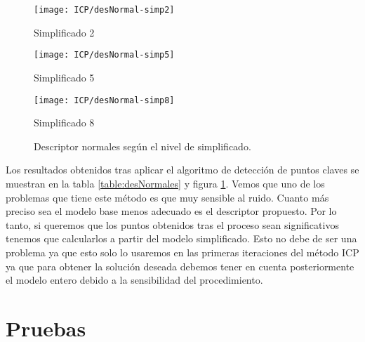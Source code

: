 \begin{figure}[h!]
	\begin{minipage}[b]{0.5\textwidth}
		\centering
		\texttt{[image: ICP/desNormal-simp2]}
		\caption*{Simplificado 2}
	\end{minipage}
	\begin{minipage}[b]{0.5\textwidth}
		\centering
		\texttt{[image: ICP/desNormal-simp5]}
		\caption*{Simplificado 5}
	\end{minipage}
	\begin{center}
		\begin{minipage}[b]{0.5\textwidth}
		\centering
		\texttt{[image: ICP/desNormal-simp8]}
		\caption*{Simplificado 8}
	\end{minipage}
	\end{center}
	\caption{Descriptor normales según el nivel de simplificado.}
	\label{Ej_simpli_real}
\end{figure}
Los resultados obtenidos tras aplicar el algoritmo de detección de puntos claves se muestran en la tabla \ref{table:desNormales} y figura \ref{Ej_simpli_real}. Vemos que uno de los problemas que tiene este método es que muy sensible al ruido. Cuanto más preciso sea el modelo base menos adecuado es el descriptor propuesto. Por lo tanto, si queremos que los puntos obtenidos tras el proceso sean significativos tenemos que calcularlos a partir del modelo simplificado. Esto no debe de ser una problema ya que esto solo lo usaremos en las primeras iteraciones del método ICP ya que para obtener la solución deseada debemos tener en cuenta posteriormente el modelo entero debido a la sensibilidad del procedimiento. 

\section{Pruebas}
